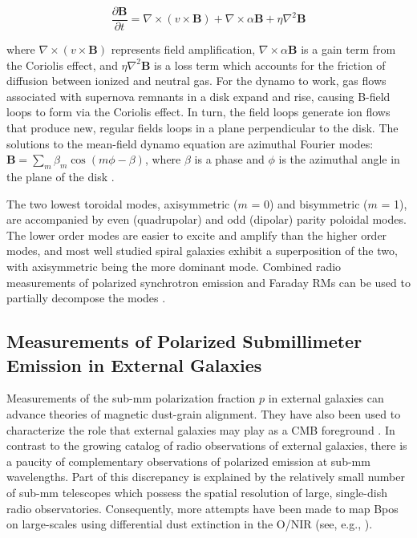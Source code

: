 \begin{equation}\label{eq:dynamo}
\frac{\partial \textbf{B}}{\partial t} = \nabla \times (v \times \textbf{B}) + \nabla \times \alpha \textbf{B} + \eta \nabla^{2} \textbf{B}
\end{equation}

where $\nabla \times (v \times \textbf{B})$ represents field amplification, $\nabla \times \alpha \textbf{B}$ is a gain term from the Coriolis effect, and $\eta \nabla^{2} \textbf{B}$ is a loss term which accounts for the friction of diffusion between ionized and neutral gas. For the dynamo to work, gas flows associated with supernova remnants in a disk expand and rise, causing B-field loops to form via the Coriolis effect. In turn, the field loops generate ion flows that produce new, regular fields loops in a plane perpendicular to the disk. The solutions to the mean-field dynamo equation are azimuthal Fourier modes: $\boldsymbol{B} = \sum_{m} \beta_{m}\cos(m\phi - \beta)$, where $\beta$ is a phase and $\phi$ is the azimuthal angle in the plane of the disk \citep{sofue1985large}.

The two lowest toroidal modes, axisymmetric ($m$ = 0) and bisymmetric ($m$ = 1), are accompanied by even (quadrupolar) and odd (dipolar) parity poloidal modes. The lower order modes are easier to excite and amplify than the higher order modes, and most well studied spiral galaxies exhibit a superposition of the two, with axisymmetric being the more dominant mode. Combined radio measurements of polarized synchrotron emission and Faraday RMs can be used to partially decompose the modes \citep{beck2008measuring}.

\subsection{Measurements of Polarized Submillimeter Emission in External Galaxies}

Measurements of the sub-mm polarization fraction $p$ in external galaxies can advance theories of magnetic dust-grain alignment. They have also been used to characterize the role that external galaxies may play as a CMB foreground \citep{seiffert2006upper}. In contrast to the growing catalog of radio observations of external galaxies, there is a paucity of complementary observations of polarized emission at sub-mm wavelengths. Part of this discrepancy is explained by the relatively small number of sub-mm telescopes which possess the spatial resolution of large, single-dish radio observatories. Consequently, more attempts have been made to map \gls{Bpos} on large-scales using differential dust extinction in the O/NIR (see, e.g., \citet{fendt1998spiral}).

